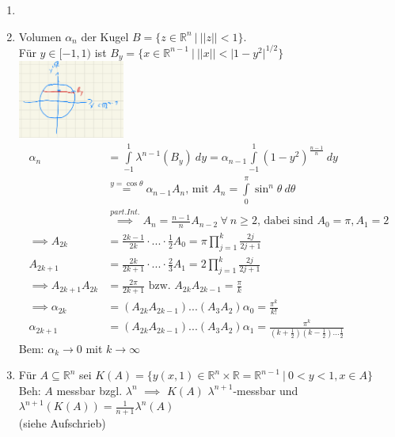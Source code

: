   \begin{example}
    \begin{enumerate}
      \item[]
      \item Volumen $\alpha_n$ der Kugel $B=\{z \in \mathbb{R}^n \ | \ ||z|| < 1\}.$\\
        Für $y \in [-1,1)$ ist $B_y = \{x \in \mathbb{R}^{n-1} \ | \ ||x|| < |1-y^2|^{1/2}\}$\\
        \includegraphics[width=3.5cm]{img/VI_Bsp_3_Kreis.png}
        \begin{align*}
          \alpha_n &=  \int\limits_{-1}^1 \lambda^{n-1}(B_y) \ dy = \alpha_{n-1} \int\limits_{-1}^1 (1-y^2)^{\frac{n-1}{n}} \ dy\\
          &\stackrel{y=\cos \theta}{=} \alpha_{n-1} A_n \text{, mit } A_n = \int\limits_0^{\pi} \sin^n\theta \ d\theta\\
          &\stackrel{part. Int.}{\implies} A_n = \frac{n-1}{n} A_{n-2} \ \forall \ n \geq 2 \text{, dabei sind } A_0 = \pi, A_1 = 2\\
          \implies A_{2k} &= \frac{2k-1}{2k} \cdot ... \cdot \frac{1}{2} A_0 = \pi \prod\limits_{j=1}^k \frac{2j}{2j+1}\\
          A_{2k+1} &= \frac{2k}{2k+1} \cdot ... \cdot \frac{2}{3} A_1 =2 \prod\limits_{j=1}^k \frac{2j}{2j+1}\\
          \implies A_{2k+1} A_{2k} &= \frac{2\pi}{2k+1} \text{ bzw. } A_{2k} A_{2k-1} = \frac{\pi}{k}\\
          \implies \alpha_{2k} &= (A_{2k}A_{2k-1}) ... (A_3 A_2) \alpha_0 = \frac{\pi^k}{k!}\\
          \alpha_{2k+1} &= (A_{2k}A_{2k-1}) ... (A_3 A_2) \alpha_1 = \frac{\pi^k}{(k+\frac{1}{2})(k-\frac{1}{2})...\frac{1}{2}}
        \end{align*}
        Bem: $\alpha_k \to 0$ mit $k \to \infty$
      \item Für $A \subseteq \mathbb{R}^n$ sei $K(A) = \{y (x,1) \in \mathbb{R}^n \times \mathbb{R} = \mathbb{R}^{n-1} \ | \ 0<y<1, x\in A\}$\\
        Beh: $A$ messbar bzgl. $\lambda^n$ $\implies$ $K(A)$ $\lambda^{n+1}$-messbar und $\lambda^{n+1}(K(A)) = \frac{1}{n+1}\lambda^n(A)$\\
        (siehe Aufschrieb)
    \end{enumerate}
  \end{example}

